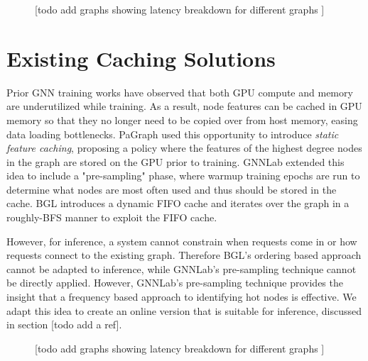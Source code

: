\begin{figure}[h!]
    \centering
    
    \caption{[todo add graphs showing latency breakdown for different graphs ]}
    \label{GPU Sampling Latency Breakdown}
\end{figure}    

\section{Existing Caching Solutions}
Prior GNN training works have observed that both GPU compute and memory are underutilized while training. 
As a result, node features can be cached in GPU memory so that they no longer need to be copied over from host memory, easing data loading bottlenecks.
PaGraph \cite{PaGraph_2020} used this opportunity to introduce \textit{static feature caching}, proposing a policy where the features of the highest degree nodes in the graph are stored on the GPU prior to training. 
GNNLab \cite{GNNLab_2022} extended this idea to include a "pre-sampling" phase, where warmup training epochs are run to determine what nodes are most often used and thus should be stored in the cache.
BGL \cite{BGL_2023} introduces a dynamic FIFO cache and iterates over the graph in a roughly-BFS manner to exploit the FIFO cache.

However, for inference, a system cannot constrain when requests come in or how requests connect to the existing graph. Therefore BGL's ordering based approach cannot be adapted to inference, while GNNLab's pre-sampling technique cannot be directly applied. However, GNNLab's pre-sampling technique provides the insight that a frequency based approach to identifying hot nodes is effective. We adapt this idea to create an online version that is suitable for inference, discussed in section [todo add a ref].

\begin{figure}[h!]
    \centering
    
    \caption{[todo add graphs showing latency breakdown for different graphs ]}
    \label{Static Cache Latency Breakdown}
\end{figure}    